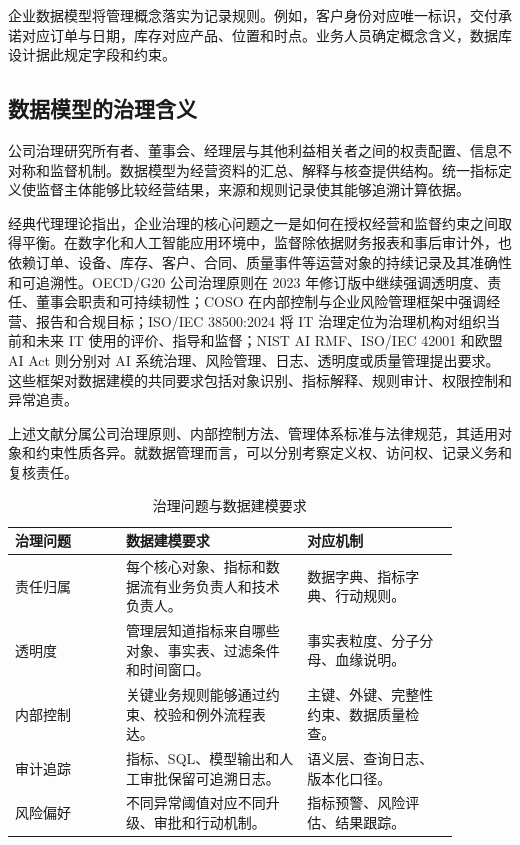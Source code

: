企业数据模型将管理概念落实为记录规则。例如，客户身份对应唯一标识，交付承诺对应订单与日期，库存对应产品、位置和时点。业务人员确定概念含义，数据库设计据此规定字段和约束。

\subsection{数据模型的治理含义}

公司治理研究所有者、董事会、经理层与其他利益相关者之间的权责配置、信息不对称和监督机制。数据模型为经营资料的汇总、解释与核查提供结构。统一指标定义使监督主体能够比较经营结果，来源和规则记录使其能够追溯计算依据。

经典代理理论指出，企业治理的核心问题之一是如何在授权经营和监督约束之间取得平衡。在数字化和人工智能应用环境中，监督除依据财务报表和事后审计外，也依赖订单、设备、库存、客户、合同、质量事件等运营对象的持续记录及其准确性和可追溯性。OECD/G20 公司治理原则在 2023 年修订版中继续强调透明度、责任、董事会职责和可持续韧性；COSO 在内部控制与企业风险管理框架中强调经营、报告和合规目标；ISO/IEC 38500:2024 将 IT 治理定位为治理机构对组织当前和未来 IT 使用的评价、指导和监督；NIST AI RMF、ISO/IEC 42001 和欧盟 AI Act 则分别对 AI 系统治理、风险管理、日志、透明度或质量管理提出要求\cite{oecd2023,coso2013,coso2017,iso38500,nist2023airmf,iso42001,euai2024}。这些框架对数据建模的共同要求包括对象识别、指标解释、规则审计、权限控制和异常追责。

上述文献分属公司治理原则、内部控制方法、管理体系标准与法律规范，其适用对象和约束性质各异。就数据管理而言，可以分别考察定义权、访问权、记录义务和复核责任。

\begin{table}[htbp]
\centering
\caption{治理问题与数据建模要求}
\begin{tabular}{P{0.22\linewidth}P{0.36\linewidth}P{0.30\linewidth}}
\toprule
{}
治理问题 & 数据建模要求 & 对应机制\\
\midrule
责任归属 & 每个核心对象、指标和数据流有业务负责人和技术负责人。 & 数据字典、指标字典、行动规则。\\
透明度 & 管理层知道指标来自哪些对象、事实表、过滤条件和时间窗口。 & 事实表粒度、分子分母、血缘说明。\\
内部控制 & 关键业务规则能够通过约束、校验和例外流程表达。 & 主键、外键、完整性约束、数据质量检查。\\
审计追踪 & 指标、SQL、模型输出和人工审批保留可追溯日志。 & 语义层、查询日志、版本化口径。\\
风险偏好 & 不同异常阈值对应不同升级、审批和行动机制。 & 指标预警、风险评估、结果跟踪。\\
\bottomrule
\end{tabular}
\end{table}

